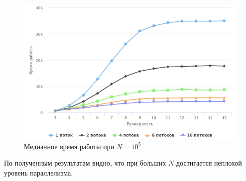 \begin{figure}[h]
\centering
\includegraphics[width=\textwidth]{images/100k.png}
\caption{Медианное время работы при $N=10^5$}
\label{pic1}
\end{figure}

По полученным результатам видно, что при больших $N$ достигается неплохой уровень параллелизма.

